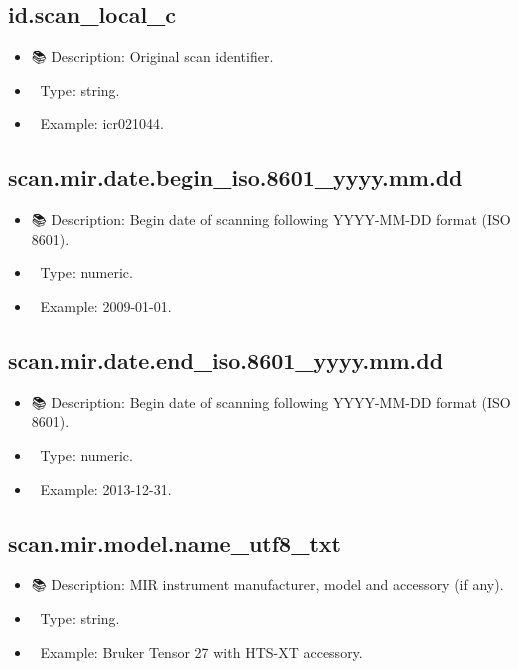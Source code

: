 \documentclass[
  letterpaper,
  DIV=11,
  numbers=noendperiod]{scrreprt}
\providecommand{\tightlist}{%
  \setlength{\itemsep}{0pt}\setlength{\parskip}{0pt}}\usepackage{longtable,booktabs,array}
\begin{document}
\subsection{id.scan\_local\_c}\label{id.scan_local_c}

\begin{itemize}
\tightlist
\item
  📚 Description: Original scan identifier.
\item
  🔢 Type: string.
\item
  📖 Example: icr021044.
\end{itemize}

\subsection{scan.mir.date.begin\_iso.8601\_yyyy.mm.dd}\label{scan.mir.date.begin_iso.8601_yyyy.mm.dd}

\begin{itemize}
\tightlist
\item
  📚 Description: Begin date of scanning following YYYY-MM-DD format
  (ISO 8601).
\item
  🔢 Type: numeric.
\item
  📖 Example: 2009-01-01.
\end{itemize}

\subsection{scan.mir.date.end\_iso.8601\_yyyy.mm.dd}\label{scan.mir.date.end_iso.8601_yyyy.mm.dd}

\begin{itemize}
\tightlist
\item
  📚 Description: Begin date of scanning following YYYY-MM-DD format
  (ISO 8601).
\item
  🔢 Type: numeric.
\item
  📖 Example: 2013-12-31.
\end{itemize}

\subsection{scan.mir.model.name\_utf8\_txt}\label{scan.mir.model.name_utf8_txt}

\begin{itemize}
\tightlist
\item
  📚 Description: MIR instrument manufacturer, model and accessory (if
  any).
\item
  🔢 Type: string.
\item
  📖 Example: Bruker Tensor 27 with HTS-XT accessory.
\end{itemize}
\end{document}
